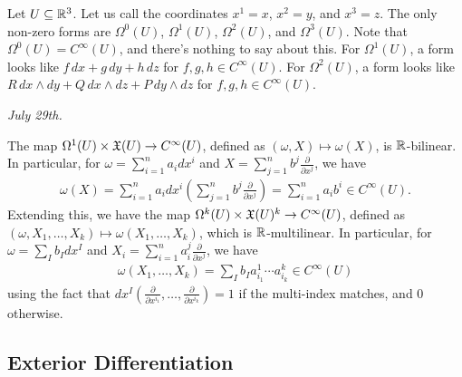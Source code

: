 \begin{example}
    Let $U \subseteq \mathbb{R}^{3}$. Let us call the coordinates $x^{1} = x$, $x^{2} = y$, and $x^{3} = z$. The only non-zero forms are $\Omega^{0}(U)$, $\Omega^{1}(U)$, $\Omega^{2}(U)$, and $\Omega^{3}(U)$. Note that $\Omega^{0}(U) = C^{\infty}(U)$, and there's nothing to say about this. For $\Omega^{1}(U)$, a form looks like $f\, dx + g\, dy + h\, dz$ for $f,g,h \in C^{\infty}(U)$. For $\Omega^{2}(U)$, a form looks like $R\, dx \wedge dy + Q\, dx \wedge dz + P\, dy \wedge dz$ for $f,g,h \in C^{\infty}(U)$.
\end{example}

\textit{July 29th.}

\noindent The map $\Omega^{1}(U) \times \mathfrak{X}(U) \to C^{\infty}(U)$, defined as $(\omega,X) \mapsto \omega(X)$, is $\mathbb{R}$-bilinear. In particular, for $\omega = \sum_{i=1}^{n} a_{i} dx^{i}$ and $X = \sum_{j=1}^{n} b^{j} \frac{\partial}{\partial x^{j}}$, we have
\begin{align}
    \omega(X) = \sum_{i=1}^{n} a_{i} dx^{i}\left( \sum_{j=1}^{n} b^{j} \frac{\partial}{\partial x^{j}} \right) = \sum_{i=1}^{n} a_{i} b^{i} \in C^{\infty}(U).
\end{align}
Extending this, we have the map $\Omega^{k}(U) \times \mathfrak{X}(U)^{k} \to C^{\infty}(U)$, defined as $(\omega,X_{1},\ldots,X_{k}) \mapsto \omega(X_{1},\ldots,X_{k})$, which is $\mathbb{R}$-multilinear. In particular, for $\omega = \sum_{I} b_{I} dx^{I}$ and $X_{i} = \sum_{i=1}^{n} a_{i}^{j} \frac{\partial}{\partial x^{j}}$, we have
\begin{align}
    \omega(X_{1},\ldots,X_{k}) = \sum_{I} b_{I} a_{i_{1}}^{1} \cdots a_{i_{k}}^{k} \in C^{\infty}(U)
\end{align}
using the fact that $dx^{I}(\frac{\partial}{\partial x^{i_{1}}},\ldots,\frac{\partial}{\partial x^{i_{k}}}) = 1$ if the multi-index matches, and $0$ otherwise.

\subsection{Exterior Differentiation}

